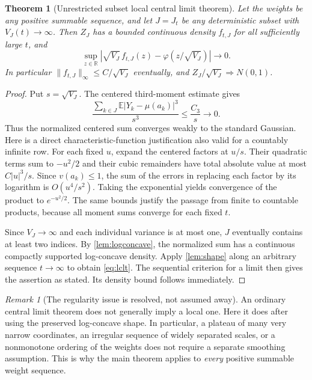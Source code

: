 \documentclass[11pt,a4paper]{article}
\numberwithin{equation}{section}
\newtheorem{theorem}{Theorem}[section]
\theoremstyle{definition}
\theoremstyle{remark}
\newtheorem{remark}[remark]{Remark}
\newcommand{\R}{\mathbb R}
\newcommand{\E}{\mathbb E}
\newcommand{\phiN}{\varphi}
\begin{document}
\begin{theorem}[Unrestricted subset local central limit theorem]
\label{thm:lclt}
Let the weights be any positive summable sequence, and let
$J=J_t$ be any deterministic subset with $V_J(t)\to\infty$.
Then $Z_J$ has a bounded continuous density $f_{t,J}$ for all
sufficiently large $t$, and
\begin{equation}\label{eq:lclt}
 \sup_{z\in\R}\left|
 \sqrt{V_J}\,f_{t,J}(z)-\phiN(z/\sqrt{V_J})\right|\longrightarrow0.
\end{equation}
In particular $\|f_{t,J}\|_\infty\le C/\sqrt{V_J}$ eventually,
and $Z_J/\sqrt{V_J}\Rightarrow N(0,1)$.
\end{theorem}
\begin{proof}
Put $s=\sqrt{V_J}$. The centered third-moment estimate gives
\[
 \frac{\sum_{k\in J}\E|Y_k-\mu(a_k)|^3}{s^3}
 \le\frac{C_3}{s}\longrightarrow0.
\]
Thus the normalized centered sum converges weakly to the standard
Gaussian. Here is a direct characteristic-function justification
also valid for a countably infinite row. For each fixed $u$, expand
the centered factors at $u/s$. Their quadratic terms sum to
$-u^2/2$ and their cubic remainders have total absolute value at
most $C|u|^3/s$. Since $v(a_k)\le1$, the sum of the errors in
replacing each factor by its logarithm is $O(u^4/s^2)$.
Taking the exponential yields convergence of the product to
$e^{-u^2/2}$. The same bounds justify the passage from finite to
countable products, because all moment sums converge for each
fixed $t$.

Since $V_J\to\infty$ and each individual variance is at most one,
$J$ eventually contains at least two indices. By
\cref{lem:logconcave}, the normalized sum has a continuous
compactly supported log-concave density. Apply \cref{lem:shape}
along an arbitrary sequence $t\to\infty$ to obtain
\cref{eq:lclt}. The sequential criterion for a limit then gives
the assertion as stated. Its density bound follows immediately.
\end{proof}

\begin{remark}[The regularity issue is resolved, not assumed away]
An ordinary central limit theorem does not generally imply a
local one. Here it does after using the preserved log-concave
shape. In particular, a plateau of many very narrow coordinates,
an irregular sequence of widely separated scales, or a
nonmonotone ordering of the weights does not require a separate
smoothing assumption. This is why the main theorem applies to
\emph{every} positive summable weight sequence.
\end{remark}
\end{document}
